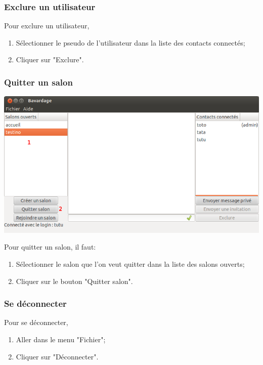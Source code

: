 \documentclass[a4paper,11pt,french]{book}
\begin{document}
\subsubsection{Exclure un utilisateur}
Pour exclure un utilisateur,
\begin{enumerate}
    \item Sélectionner le pseudo de l'utilisateur dans la liste des contacts connectés;
    \item Cliquer sur "Exclure".
\end{enumerate}

\subsubsection{Quitter un salon}

\includegraphics[width=45em]{capture/quit_room.png}

Pour quitter un salon, il faut:

\begin{enumerate}
    \item Sélectionner le salon que l'on veut quitter dans la liste des salons ouverts;
    \item Cliquer sur le bouton "Quitter salon".

\end{enumerate}

\subsubsection{Se déconnecter}
Pour se déconnecter,
\begin{enumerate}
    \item Aller dans le menu "Fichier";
    \item Cliquer sur "Déconnecter".
\end{enumerate}
\end{document}
